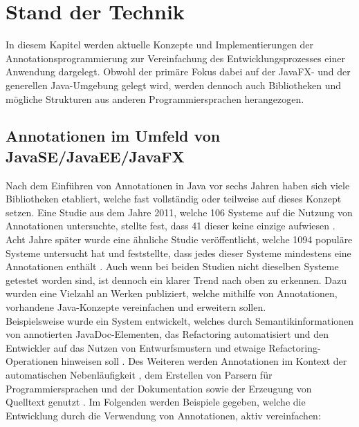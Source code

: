 \chapter{Stand der Technik}
\label{stand_der_technik}
\noindent In diesem Kapitel werden aktuelle Konzepte und Implementierungen der Annotationsprogrammierung zur Vereinfachung des Entwicklungsprozesses einer Anwendung dargelegt. Obwohl der primäre Fokus dabei auf der JavaFX- und der generellen Java-Umgebung gelegt wird, werden dennoch auch Bibliotheken und mögliche Strukturen aus anderen Programmiersprachen herangezogen.

\section{Annotationen im Umfeld von JavaSE/JavaEE/JavaFX}
\label{verwendung_im_umfeld_von_java}
Nach dem Einführen von Annotationen in Java vor sechs Jahren haben sich viele Bibliotheken etabliert, welche fast vollständig oder teilweise auf dieses Konzept setzen. Eine Studie aus dem Jahre 2011, welche 106 Systeme auf die Nutzung von Annotationen untersuchte, stellte fest, dass 41 dieser keine einzige aufwiesen \cite{Rocha2011}. Acht Jahre später wurde eine ähnliche Studie veröffentlicht, welche 1094 populäre Systeme untersucht hat und feststellte, dass jedes dieser Systeme mindestens eine Annotationen enthält \cite{Yu2019}. Auch wenn bei beiden Studien nicht dieselben Systeme getestet worden sind, ist dennoch ein klarer Trend nach oben zu erkennen. Dazu wurden eine Vielzahl an Werken publiziert, welche mithilfe von Annotationen, vorhandene Java-Konzepte vereinfachen und erweitern sollen.\\
Beispielsweise wurde ein System entwickelt, welches durch Semantikinformationen von annotierten JavaDoc-Elementen, das Refactoring automatisiert und den Entwickler auf das Nutzen von Entwurfsmustern und etwaige Refactoring-Operationen hinweisen soll \cite{Meffert2006}. Des Weiteren werden Annotationen im Kontext der automatischen Nebenläufigkeit \cite{Danelutto2007}, dem Erstellen von Parsern für Programmiersprachen \cite{Porubaen2009} und der Dokumentation sowie der Erzeugung von Quelltext genutzt \cite{Sulir2016, Miroslav2009}.
Im Folgenden werden Beispiele gegeben, welche die Entwicklung durch die Verwendung von Annotationen, aktiv vereinfachen:
